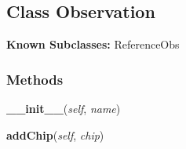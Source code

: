 
\subsection{Class Observation}

    \label{multireg:chipwavelets:Observation}
\textbf{Known Subclasses:} ReferenceObs



  \subsubsection{Methods}

    \label{multireg:chipwavelets:Observation:__init__}
    \vspace{0.5ex}

    \begin{boxedminipage}{\textwidth}

    \raggedright \textbf{\_\_init\_\_}(\textit{self}, \textit{name})

    \end{boxedminipage}

    \label{multireg:chipwavelets:Observation:addChip}
    \vspace{0.5ex}

    \begin{boxedminipage}{\textwidth}

    \raggedright \textbf{addChip}(\textit{self}, \textit{chip})

    \end{boxedminipage}

    \label{multireg:chipwavelets:Observation:computeFeatureMatrices}
    \vspace{0.5ex}

